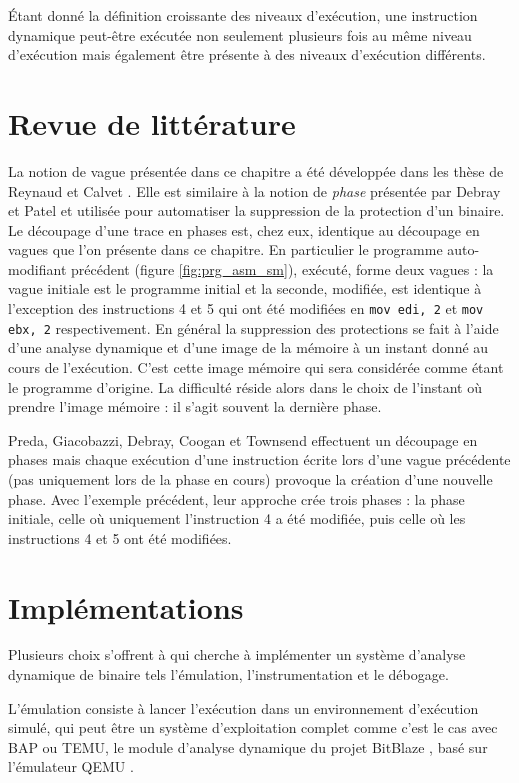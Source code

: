 \begin{rem}
 Étant donné la définition croissante des niveaux d'exécution, une instruction dynamique peut-être exécutée non seulement plusieurs fois au même niveau d'exécution mais également être présente à des niveaux d'exécution différents.
\end{rem}

\section{Revue de littérature}
La notion de vague présentée dans ce chapitre a été développée dans les thèse de Reynaud \cite{Reynaud2010} et Calvet \cite{Calvet2013}.
Elle est similaire à la notion de \emph{phase} présentée par Debray et Patel \cite{DP10} et utilisée pour automatiser la suppression de la protection d'un binaire. Le découpage d'une trace en phases est, chez eux, identique au découpage en vagues que l'on présente dans ce chapitre.
En particulier le programme auto-modifiant précédent (figure \ref{fig:prg_asm_sm}), exécuté, forme deux vagues : la vague initiale est le programme initial et la seconde, modifiée, est identique à l'exception des instructions 4 et 5 qui ont été modifiées en \texttt{mov edi, 2} et \texttt{mov ebx, 2} respectivement.
En général la suppression des protections se fait à l'aide d'une analyse dynamique et d'une image de la mémoire à un instant donné au cours de l'exécution. C'est cette image mémoire qui sera considérée comme étant le programme d'origine. La difficulté réside alors dans le choix de l'instant où prendre l'image mémoire : il s'agit souvent la dernière phase.

Preda, Giacobazzi, Debray, Coogan et Townsend \cite{PGDCT10} effectuent un découpage en phases mais chaque exécution d'une instruction écrite lors d'une vague précédente (pas uniquement lors de la phase en cours) provoque la création d'une nouvelle phase.
Avec l'exemple précédent, leur approche crée trois phases : la phase initiale, celle où uniquement l'instruction 4 a été modifiée, puis celle où les instructions 4 et 5 ont été modifiées.

\section{Implémentations}
Plusieurs choix s'offrent à qui cherche à implémenter un système d'analyse dynamique de binaire tels l'émulation, l'instrumentation et le débogage.

L'émulation consiste à lancer l'exécution dans un environnement d'exécution simulé, qui peut être un système d'exploitation complet comme c'est le cas avec BAP ou TEMU, le module d'analyse dynamique du projet BitBlaze \cite{bitblaze08}, basé sur l'émulateur QEMU \cite{QEMU05}.

